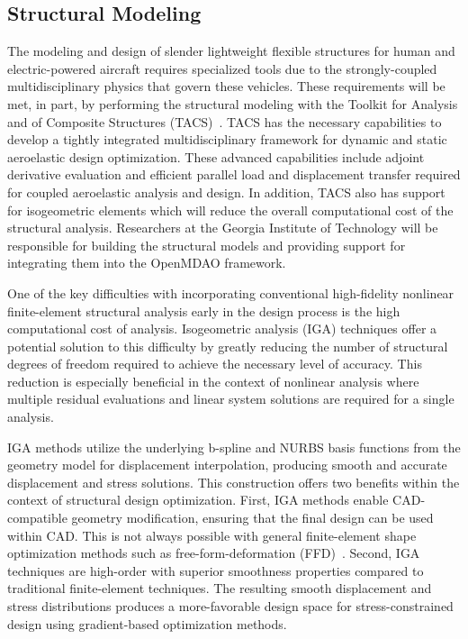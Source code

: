\documentclass[]{aiaa-tc}
\begin{document}
 
    
        \subsection{Structural Modeling}

The modeling and design of slender lightweight flexible structures for
human and electric-powered aircraft requires specialized tools due to
the strongly-coupled multidisciplinary physics that govern these
vehicles. These requirements will be met, in part, by performing the
structural modeling with the Toolkit for Analysis and of Composite
Structures (TACS)~\cite{Kennedy:2014:TACS,
  Kennedy:2014:tacs-tripan}. TACS has the necessary capabilities to
develop a tightly integrated multidisciplinary framework for dynamic
and static aeroelastic design optimization. These advanced
capabilities include adjoint derivative evaluation and efficient
parallel load and displacement transfer required for coupled
aeroelastic analysis and design.  In addition, TACS also has support
for isogeometric elements which will reduce the overall computational
cost of the structural analysis. Researchers at the Georgia Institute
of Technology will be responsible for building the structural models
and providing support for integrating them into the OpenMDAO
framework.

One of the key difficulties with incorporating conventional
high-fidelity nonlinear finite-element structural analysis early in
the design process is the high computational cost of
analysis. Isogeometric analysis (IGA) techniques offer a potential
solution to this difficulty by greatly reducing the number of
structural degrees of freedom required to achieve the necessary level
of accuracy. This reduction is especially beneficial in the context of
nonlinear analysis where multiple residual evaluations and linear
system solutions are required for a single analysis.
 
IGA methods utilize the underlying b-spline and NURBS basis functions
from the geometry model for displacement interpolation, producing
smooth and accurate displacement and stress solutions.  This
construction offers two benefits within the context of structural
design optimization. First, IGA methods enable CAD-compatible geometry
modification, ensuring that the final design can be used within
CAD. This is not always possible with general finite-element shape
optimization methods such as free-form-deformation
(FFD)~\cite{Sederberg:1986:FFD, Kenway:2010:CAD}.  Second, IGA
techniques are high-order with superior smoothness properties compared
to traditional finite-element techniques. The resulting smooth
displacement and stress distributions produces a more-favorable design
space for stress-constrained design using gradient-based optimization
methods.
\end{document}
